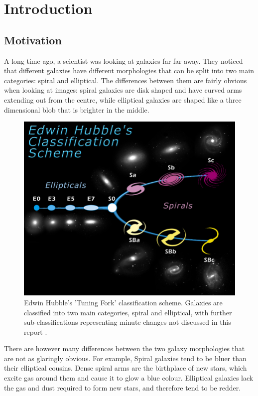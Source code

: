 \section{Introduction}
\label{sec:intro}
\subsection{Motivation}
A long time ago, a scientist was looking at galaxies far far away. 
They noticed that different galaxies have different morphologies that can be split into two main categories: spiral and elliptical. 
The differences between them are fairly obvious when looking at images: spiral galaxies are disk shaped and have curved arms extending out from the centre, while elliptical galaxies are shaped like a three dimensional blob that is brighter in the middle. 

\begin{figure}[h]
	\centering
	\captionsetup{justification=centering,width=.8\linewidth}
	\includegraphics[scale=0.7]{Figures/TuningFork.jpg}
	\caption{Edwin Hubble's 'Tuning Fork' classification scheme. Galaxies are classified into two main categories, spiral and elliptical, with further sub-classifications representing minute changes not discussed in this report \cite{TuningFork}.}
	\label{fig:tuningfork}
\end{figure}


There are however many differences between the two galaxy morphologies that are not as glaringly obvious.  
For example, Spiral galaxies tend to be bluer than their elliptical cousins. 
Dense spiral arms are the birthplace of new stars, which excite gas around them and cause it to glow a blue colour. 
Elliptical galaxies lack the gas and dust required to form new stars, and therefore tend to be redder.

